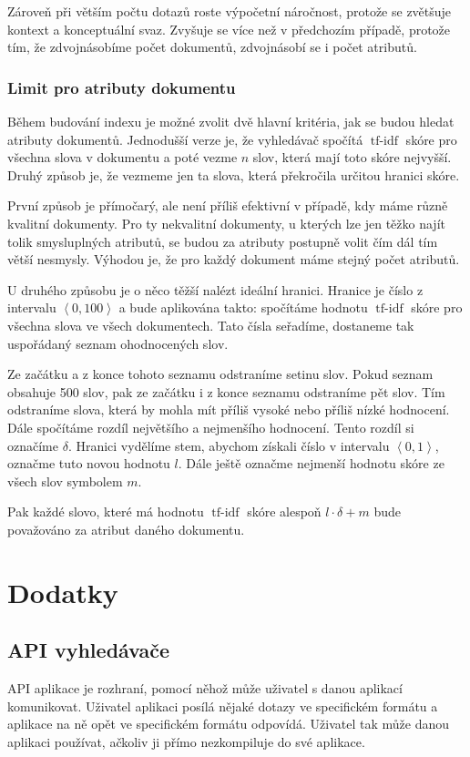 \documentclass[12pt]{article}
\newcommand{\ssection}[1]{\subsection{#1}}
\newcommand{\sssection}[1]{\subsubsection{#1}}
\newcommand{\addsp}[1]{\left<#1\right>}
\DeclareMathOperator{\tfidf}{tf-idf}
\begin{document}
Zároveň při větším počtu dotazů roste výpočetní náročnost, protože se zvětšuje kontext a konceptuální svaz. Zvyšuje se více než v předchozím případě, protože tím, že zdvojnásobíme počet dokumentů, zdvojnásobí se i počet atributů. 

\sssection{Limit pro atributy dokumentu}
Během budování indexu je možné zvolit dvě hlavní kritéria, jak se budou hledat atributy dokumentů. Jednodušší verze je, že vyhledávač spočítá $\tfidf$ skóre pro všechna slova v dokumentu a poté vezme $n$ slov, která mají toto skóre nejvyšší. Druhý způsob je, že vezmeme jen ta slova, která překročila určitou hranici skóre. 

První způsob je přímočarý, ale není příliš efektivní v případě, kdy máme různě kvalitní dokumenty. Pro ty nekvalitní dokumenty, u kterých lze jen těžko najít tolik smysluplných atributů, se budou za atributy postupně volit čím dál tím větší nesmysly. Výhodou je, že pro každý dokument máme stejný počet atributů.

U druhého způsobu je o něco těžší nalézt ideální hranici. Hranice je číslo z intervalu $\addsp{0, 100}$ a bude aplikována takto: spočítáme hodnotu $\tfidf$ skóre pro všechna slova ve všech dokumentech. Tato čísla seřadíme, dostaneme tak uspořádaný seznam ohodnocených slov. 

Ze začátku a z konce tohoto seznamu odstraníme setinu slov. Pokud seznam obsahuje 500 slov, pak ze začátku i z konce seznamu odstraníme pět slov. Tím odstraníme slova, která by mohla mít příliš vysoké nebo příliš nízké hodnocení. Dále spočítáme rozdíl největšího a nejmenšího hodnocení. Tento rozdíl si označíme $\delta$. Hranici vydělíme stem, abychom získali číslo v intervalu $\addsp{0, 1}$, označme tuto novou hodnotu $l$. Dále ještě označme nejmenší hodnotu skóre ze všech slov symbolem $m$. 

Pak každé slovo, které má hodnotu $\tfidf$ skóre alespoň $l\cdot\delta+m$ bude považováno za atribut daného dokumentu. 



\newpage
\section{Dodatky}

\ssection{API vyhledávače}

API aplikace je rozhraní, pomocí něhož může uživatel s danou aplikací komunikovat. Uživatel aplikaci posílá nějaké dotazy ve specifickém formátu a aplikace na ně opět ve specifickém formátu odpovídá. Uživatel tak může danou aplikaci používat, ačkoliv ji přímo nezkompiluje do své aplikace.  
\end{document}
